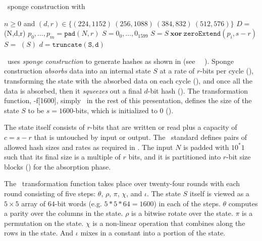 \begin{algorithm}[t]
  \caption{\shaThree\ sponge construction with \keccak}\label{alg:sha3}
  \begin{algorithmic}[1]
    \Require $n \geq 0$ and $(d,r) \in \{(224, 1152)\ (256, 1088)\ (384, 832)\ (512, 576)\}$
    \Ensure $D =$ \shaThree(N,d,r)
    \State $p_0, \ldots, p_m = \mathtt{pad}(N, r)$\label{line:pad}
    \State $S = 0_0, \ldots, 0_{1599}$\label{line:init}
      \State $S = S\ \mathbf{xor}\ \mathtt{zeroExtend}(p_i, s-r)$\label{line:absorb}
      \State $S =$ \keccak$(S)$\label{line:keccak}
    \EndFor
    \State $d = \mathtt{truncate(S,d)}$\label{line:squeeze}
  \end{algorithmic}
\end{algorithm}

\shaThree\ uses \emph{sponge construction} to generate hashes as shown in  (see \nist\ \fips\ \cite{fips202}).
Sponge construction \emph{absorbs} data into an internal state $S$ at a rate of $r$-bits per cycle (), transforming the state with the absorbed data on each cycle (), and once all the data is absorbed, then it \emph{squeezes} out a final $d$-bit hash ().
The transformation function, \keccak-f[1600], simply \keccak\ in the rest of this presentation, defines the size of the state $S$ to be $s = 1600$-bits, which is initialized to 0 ().

The state itself consists of $r$-bits that are written or read plus a capacity of $c = s - r$ that is untouched by input or output.
The \nist\ standard defines pairs of allowed hash sizes and rates as required in . The input $N$ is padded with $10^*1$ such that its final size is a multiple of $r$ bits, and it is partitioned into $r$-bit size blocks () for the absorption phase.

The \keccak\ transformation function takes place over twenty-four rounds with each round consisting of five steps: $\theta$, $\rho$, $\pi$, $\chi$, and $\iota$. The state $S$ itself is viewed as a $5 \times 5$ array of $64$-bit words (e.g. $5 * 5 * 64 = 1600$) in each of the steps. $\theta$ computes a parity over the columns in the state. $\rho$ is a bitwise rotate over the state. $\pi$ is a permutation on the state. $\chi$ is a non-linear operation that combines along the rows in the state. And $\iota$ mixes in a constant into a portion of the state.
